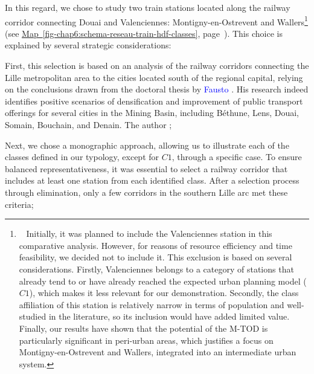 \begin{refsegment}
In this regard, we chose to study two train stations located along the railway corridor connecting Douai and Valenciennes: Montigny-en-Ostrevent and Wallers\footnote{~
    Initially, it was planned to include the Valenciennes station in this comparative analysis. However, for reasons of resource efficiency and time feasibility, we decided not to include it. This exclusion is based on several considerations. Firstly, Valenciennes belongs to a category of stations that already tend to or have already reached the expected urban planning model (\(C1\)), which makes it less relevant for our demonstration. Secondly, the class affiliation of this station is relatively narrow in terms of population and well-studied in the literature, so its inclusion would have added limited value. Finally, our results have shown that the potential of the \acrshort{M-TOD} is particularly significant in peri-urban areas, which justifies a focus on Montigny-en-Ostrevent and Wallers, integrated into an intermediate urban system.
} (see \hyperref[fig-chap6:schema-reseau-train-hdf-classes]{Map~\ref{fig-chap6:schema-reseau-train-hdf-classes}}, page~\pageref{fig-chap6:schema-reseau-train-hdf-classes}). This choice is explained by several strategic considerations:
\begin{customitemize}
    \item First, this selection is based on an analysis of the railway corridors connecting the Lille metropolitan area to the cities located south of the regional capital, relying on the conclusions drawn from the doctoral thesis by \textcolor{blue}{Fausto} \textcolor{blue}{\textcite[246]{lo_feudo_scenario_2014}}. His research indeed identifies positive scenarios of densification and improvement of public transport offerings for several cities in the Mining Basin, including Béthune, Lens, Douai, Somain, Bouchain, and Denain. The author  \textcolor{blue}{\autocite[246]{lo_feudo_scenario_2014}};
    \item Next, we chose a monographic approach, allowing us to illustrate each of the classes defined in our typology, except for \(C1\), through a specific case. To ensure balanced representativeness, it was essential to select a railway corridor that includes at least one station from each identified class. After a selection process through elimination, only a few corridors in the southern Lille arc met these criteria;

\end{customitemize}
\end{refsegment}
